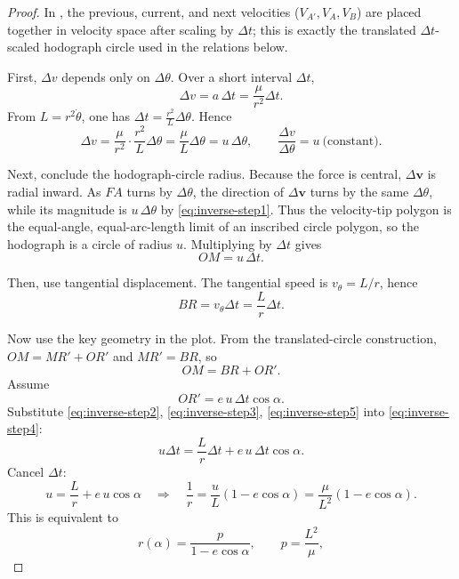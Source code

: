 \begin{proof}
In , the previous, current, and next velocities ($V_{A'},V_A,V_B$) are placed together in velocity space after scaling by $\Delta t$; this is exactly the translated $\Delta t$-scaled hodograph circle used in the relations below.

First, $\Delta v$ depends only on $\Delta\theta$.
Over a short interval $\Delta t$,
\begin{equation}
  \Delta v=a\,\Delta t=\frac{\mu}{r^2}\Delta t.
\end{equation}
From $L=r^2\dot\theta$, one has $\Delta t=\frac{r^2}{L}\Delta\theta$. Hence
\begin{equation}
  \Delta v=\frac{\mu}{r^2}\cdot\frac{r^2}{L}\Delta\theta=\frac{\mu}{L}\Delta\theta=u\,\Delta\theta,
  \qquad
  \frac{\Delta v}{\Delta\theta}=u\ \text{(constant)}.
\label{eq:inverse-step1}
\end{equation}

Next, conclude the hodograph-circle radius.
Because the force is central, $\Delta\mathbf v$ is radial inward. As $FA$ turns by $\Delta\theta$, the direction of $\Delta\mathbf v$ turns by the same $\Delta\theta$, while its magnitude is $u\,\Delta\theta$ by \eqref{eq:inverse-step1}. Thus the velocity-tip polygon is the equal-angle, equal-arc-length limit of an inscribed circle polygon, so the hodograph is a circle of radius $u$. Multiplying by $\Delta t$ gives
\begin{equation}
  OM=u\,\Delta t.
\label{eq:inverse-step2}
\end{equation}

Then, use tangential displacement.
The tangential speed is $v_\theta=L/r$, hence
\begin{equation}
  BR=v_\theta\Delta t=\frac{L}{r}\Delta t.
\label{eq:inverse-step3}
\end{equation}

Now use the key geometry in the plot.
From the translated-circle construction, $OM=MR'+OR'$ and $MR'=BR$, so
\begin{equation}
  OM=BR+OR'.
\label{eq:inverse-step4}
\end{equation}
Assume
\begin{equation}
  OR'=e\,u\,\Delta t\cos\alpha.
\label{eq:inverse-step5}
\end{equation}
Substitute \eqref{eq:inverse-step2}, \eqref{eq:inverse-step3}, \eqref{eq:inverse-step5} into \eqref{eq:inverse-step4}:
\begin{equation}
  u\Delta t=\frac{L}{r}\Delta t+e\,u\,\Delta t\cos\alpha.
\end{equation}
Cancel $\Delta t$:
\begin{equation}
  u=\frac{L}{r}+e\,u\cos\alpha
  \quad\Longrightarrow\quad
  \frac1r=\frac{u}{L}\left(1-e\cos\alpha\right)
  =\frac{\mu}{L^2}\left(1-e\cos\alpha\right).
\end{equation}
This is equivalent to
\begin{equation}
  r(\alpha)=\frac{p}{1-e\cos\alpha},
  \qquad
  p=\frac{L^2}{\mu},
\end{equation}


\end{proof}
